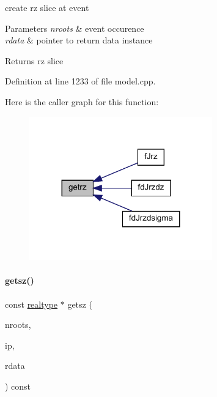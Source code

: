 create rz slice at event 
\begin{DoxyParams}{Parameters}
{\em nroots} & event occurence \\
\hline
{\em rdata} & pointer to return data instance \\
\hline
\end{DoxyParams}
\begin{DoxyReturn}{Returns}
rz slice 
\end{DoxyReturn}


Definition at line 1233 of file model.\+cpp.

Here is the caller graph for this function\+:
\nopagebreak
\begin{figure}[H]
\begin{center}
\leavevmode
\includegraphics[width=224pt]{classamici_1_1_model_ab2a9be3bb641741a52ddc48fcd9aa143_icgraph}
\end{center}
\end{figure}
\mbox{\label{classamici_1_1_model_a78863f621eda7016ab7136a357dacdaf}} 
\paragraph{\texorpdfstring{getsz()}{getsz()}}
{\footnotesize\ttfamily const \mbox{\hyperlink{namespaceamici_a1bdce28051d6a53868f7ccbf5f2c14a3}{realtype}} $\ast$ getsz (\begin{DoxyParamCaption}\item[{const int}]{nroots,  }\item[{const int}]{ip,  }\item[{const \mbox{\hyperlink{classamici_1_1_return_data}{Return\+Data}} $\ast$}]{rdata }\end{DoxyParamCaption}) const\hspace{0.3cm}{\ttfamily [protected]}}

